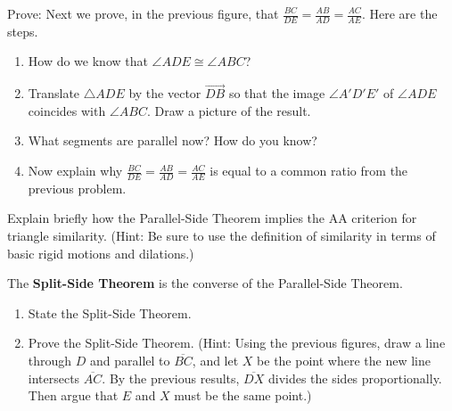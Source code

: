 \documentclass[nooutcomes]{ximera}
\begin{document}
\begin{problem}
Prove:  Next we prove, in the previous figure, that $ \frac{BC}{DE} = \frac{AB}{AD} = \frac{AC}{AE}$.  Here are the steps.  
\begin{enumerate}
\item How do we know that $\angle ADE \cong \angle ABC$?  
\item Translate $\triangle ADE$ by the vector $\overrightarrow{DB}$ so that the image $\angle A'D'E'$ of $\angle ADE$ coincides with $\angle ABC$.  Draw a picture of the result.  
\item What segments are parallel now?  How do you know?  
\item Now explain why $\frac{BC}{DE} = \frac{AB}{AD} = \frac{AC}{AE}$ is equal to a common ratio from the previous problem.  
\end{enumerate}
\end{problem}

\begin{problem}
Explain briefly how the Parallel-Side Theorem implies the AA criterion for triangle similarity.  (Hint: Be sure to use the definition of similarity in terms of basic rigid motions and dilations.)  
\end{problem}

\begin{problem}
The \textbf{Split-Side Theorem} is the converse of the Parallel-Side Theorem.   
\begin{enumerate}
\item State the Split-Side Theorem.   
\item Prove the Split-Side Theorem.  (Hint:  Using the previous figures, draw a line through $D$ and parallel to $\overline{BC}$, and let $X$ be the point where the new line intersects $\overline{AC}$.  By the previous results, $\overline{DX}$ divides the sides proportionally.  Then argue that $E$ and $X$ must be the same point.)  
\end{enumerate}
\end{problem}
\end{document}
